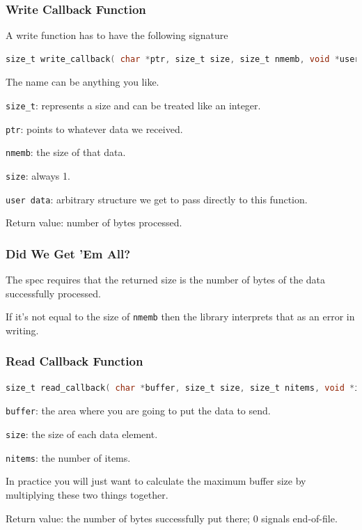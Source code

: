 \begin{frame}[fragile]
\frametitle{Write Callback Function}

A write function has to have the following signature
\begin{lstlisting}[language=C]
size_t write_callback( char *ptr, size_t size, size_t nmemb, void *userdata );
\end{lstlisting}

The name can be anything you like. 

\texttt{size\_t}: represents a size and can be treated like an integer. 

\texttt{ptr}: points to whatever data we received.

\texttt{nmemb}: the size of that data. 

\texttt{size}: always 1.

\texttt{user data}: arbitrary structure we get to pass directly to this function.

Return value: number of bytes processed.

\end{frame}

\begin{frame}
\frametitle{Did We Get 'Em All?}

The spec requires that the returned size is the number of bytes of the data successfully processed. 

If it's not equal to the size of \texttt{nmemb} then the library interprets that as an error in writing. 

\end{frame}



\begin{frame}[fragile]
\frametitle{Read Callback Function}

\begin{lstlisting}[language=C]
size_t read_callback( char *buffer, size_t size, size_t nitems, void *inputdata );
\end{lstlisting}


\texttt{buffer}: the area where you are going to put the data to send.

\texttt{size}: the size of each data element.

\texttt{nitems}: the number of items. 

In practice you will just want to calculate the maximum buffer size by multiplying these two things together.

Return value: the number of bytes successfully put there; 0 signals end-of-file.

\end{frame}



